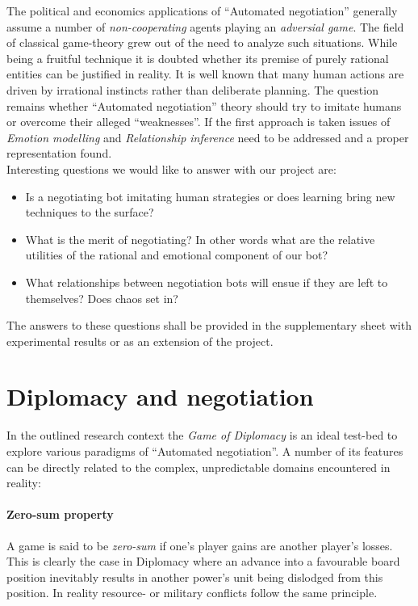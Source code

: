 \documentclass[pdftex,11pt,a4paper]{report}
\begin{document}
The political and economics applications of ``Automated negotiation'' generally
assume a number of \textit{non-cooperating} agents playing an
\textit{adversial game}. The field of classical game-theory grew out
of the need to analyze such situations.  While being a fruitful technique 
it is doubted whether its premise of purely rational entities can be
justified in reality. It is well known that many human actions
are driven by irrational instincts rather than deliberate
planning. The question remains whether ``Automated negotiation''
theory should try to imitate humans or overcome their alleged
``weaknesses''. If the first approach is taken issues of
\textit{Emotion modelling} and \textit{Relationship inference} need to
be addressed and a proper representation found. \\

Interesting questions we would like to answer with our project are:

\begin{itemize}

\item Is a negotiating bot imitating human strategies or does 
      learning bring new techniques to the surface?

\item What is the merit of negotiating? In other words what 
      are the relative utilities of the rational and emotional
      component of our bot?

\item What relationships between negotiation bots will ensue 
      if they are left to themselves? Does chaos set in?

\end{itemize}

The answers to these questions shall be provided in the 
supplementary sheet with experimental results or as an 
extension of the project.

\section{Diplomacy and negotiation}

In the outlined research context the \textit{Game of Diplomacy} is an ideal test-bed to
explore various paradigms of ``Automated negotiation''. A number of its features
can be directly related to the complex, unpredictable domains encountered in reality:

\paragraph{Zero-sum property}
A game is said to be \textit{zero-sum} if one's player gains are
another player's losses. This is clearly the case in Diplomacy where
an advance into a favourable board position inevitably results in
another power's unit being dislodged from this position. In reality
resource- or military conflicts follow the same principle.
\end{document}
